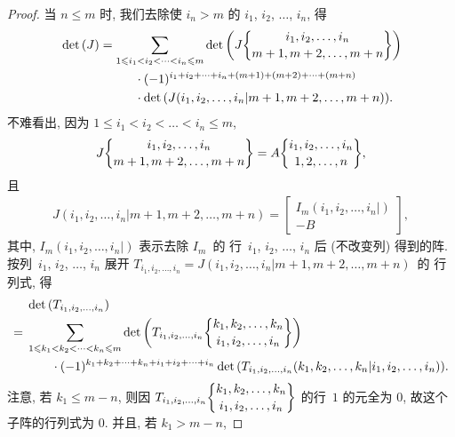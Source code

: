 \documentclass[../libro.tex]{subfiles}
\begin{document}
\begin{proof}
    当 \(n \leq m\) 时,
    我们去除使 \(i_n > m\) 的
    \(i_1\), \(i_2\), \(\dots\), \(i_n\),
    得
    \begin{align*}
        &
        \det {(J)}
        = \sum_{1 \leq i_1 < i_2 < \dots < i_n \leq m}
        {\det {\left(
                    J\submat{i_1,i_2,\dots,i_n}{m+1,m+2,\dots,m+n}
        \right)}}
        \\
        &
        \qquad \qquad \qquad
        \cdot (-1)^{i_1 + i_2 + \dots + i_n
        + (m+1) + (m+2) + \dots + (m+n)}
        \\
        &
        \qquad \qquad \qquad
        \cdot \det {(J({i_1,i_2,\dots,i_n}|{m+1,m+2,\dots,m+n}))}.
    \end{align*}
    不难看出,
    因为 \(1 \leq i_1 < i_2 < \dots < i_n \leq m\),
    \begin{align*}
        J\submat{i_1,i_2,\dots,i_n}{m+1,m+2,\dots,m+n}
        = A\submat{i_1,i_2,\dots,i_n}{1,2,\dots,n},
    \end{align*}
    且
    \begin{align*}
        J({i_1,i_2,\dots,i_n}|{m+1,m+2,\dots,m+n})
        =
        \begin{bmatrix}
            I_m (i_1,i_2,\dots,i_n|) \\
            -B
        \end{bmatrix},
    \end{align*}
    其中,
    \(I_m (i_1,i_2,\dots,i_n|)\)
    表示去除 \(I_m\)~的%
    行~\(i_1\), \(i_2\), \(\dots\), \(i_n\)
    后 (不改变列) 得到的阵.
    按列~\(i_1\), \(i_2\), \(\dots\), \(i_n\) 展开
    \(T_{i_1,i_2,\dots,i_n}
    = J({i_1,i_2,\dots,i_n}|{m+1,m+2,\dots,m+n})\)~的%
    行列式, 得
    \begin{align*}
        & \det {(T_{i_1,i_2,\dots,i_n})}
        \\
        = {} &
        \sum_{1 \leq k_1 < k_2 < \dots < k_n \leq m}
        {\det {\left(
                    T_{i_1,i_2,\dots,i_n}
                    \submat{k_1, k_2, \dots, k_n}{i_1, i_2, \dots, i_n}
        \right)}}
        \\
        &
        \qquad
        \cdot (-1)^{k_1 + k_2 + \dots + k_n
        + i_1 + i_2 + \dots + i_n}
        \det {(T_{i_1,i_2,\dots,i_n}
        ({k_1,k_2,\dots,k_n}|{i_1,i_2,\dots,i_n}))}.
    \end{align*}
    注意, 若 \(k_1 \leq m-n\),
    则因 \(T_{i_1,i_2,\dots,i_n}
    \submat{k_1,k_2,\dots,k_n}{i_1,i_2,\dots,i_n}\)
    的行~\(1\) 的元全为 \(0\),
    故这个子阵的行列式为 \(0\).
    并且, 若 \(k_1 > m-n\),

\end{proof}
\end{document}
